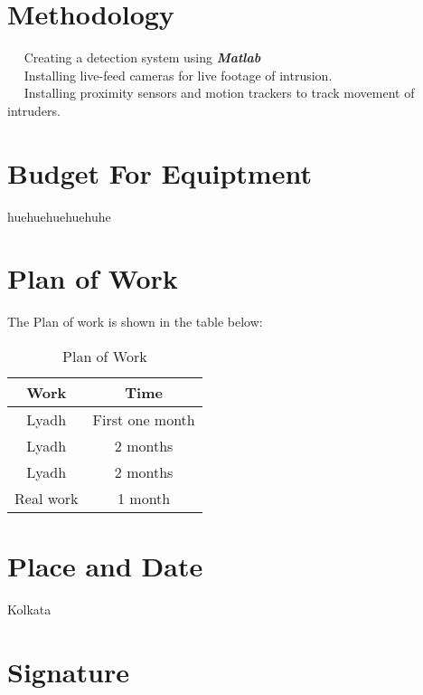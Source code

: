 \documentclass[margin, centered]{res}
\begin{document}
\begin{resume}
\section{Methodology}
~\textbullet~ Creating a detection system using \textbf{\textit{Matlab}}\\
~\textbullet~ Installing live-feed cameras for live footage of intrusion.\\
~\textbullet~ Installing proximity sensors and motion trackers to track movement of intruders.\\

\section{Budget For Equiptment} huehuehuehuehuhe

\section{Plan of Work} The Plan of work is shown in the table below:

\begin{table}[ht]
\caption{Plan of Work}
\centering
\begin{tabular}{c c}
\hline \hline
Work & Time \\
\hline
Lyadh & First one month\\
Lyadh & 2 months\\
Lyadh & 2 months\\
Real work & 1 month\\

\end{tabular}
\end{table}

\section{Place and Date} Kolkata

\section{Signature}

\end{resume}
\end{document}
